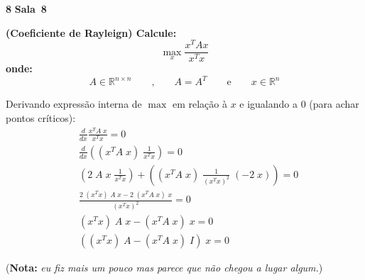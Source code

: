 \documentclass{article}
\newcommand{\R}{\mathbb{R}}
\newenvironment{question}
    {\medskip\bfseries\large}
    {\medskip}
\newcounter{exe-list}
\newenvironment{exe}[2][Sala]
    {\bigskip\noindent\par\ifthenelse{\equal{#1}{}}%
        {\textbf{\LARGE #2}}%
        {\textbf{\LARGE #1~#2}}%
    \medskip\noindent\par}
    {\bigskip}
\newcommand{\note}[1]{(\textbf{Nota:} {\itshape #1})}
\begin{document}
\begin{exe}{8}
    \begin{question}
        (Coeficiente de Rayleign) Calcule:
        \[
            \max_x \frac{ x^T A x }{ x^T x }
        \]
        onde:
        \[
            A \in \R^{n \times n}
            \qquad\text{,}\qquad
            A = A^T
            \qquad\text{e}\qquad
            x \in \R^n
        \]
    \end{question}

    Derivando expressão interna de \(\max\) em relação à \(x\)
    e igualando a \(0\) (para achar pontos críticos):
    \begin{align*}
        &\frac{d}{dx} \frac{ x^T A \; x }{ x^T x } = 0 \\
        &\frac{d}{dx} \left( (x^T A \; x) \; \frac{1}{ x^T x } \right) = 0 \\
        &\left( 2 \; A \; x \; \frac{1}{ x^T x } \right)
            + \left( (x^T A \; x) \; \frac{1}{ (x^T x)^2 } \; (-2 \; x) \right) = 0 \\
        &\frac{
                2 \; (x^T x) \; A \; x
                - 2 \; (x^T A \; x) \; x
            }{ (x^T x)^2 } = 0 \\
        & (x^T x) \; A \; x - (x^T A \; x) \; x = 0 \\
        & ((x^T x) \; A - (x^T A \; x) \; I) \; x = 0
    \end{align*}

    \note{eu fiz mais um pouco mas parece
    que não chegou a lugar algum.}


\end{exe}
\end{document}
